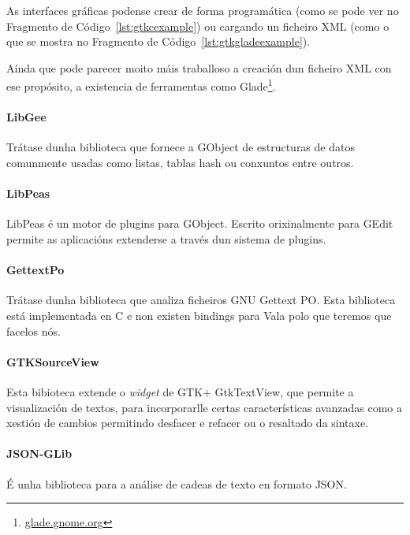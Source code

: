 

As interfaces gráficas podense crear de forma programática (como se pode ver no Fragmento de Código~\ref{lst:gtkcexample}) ou cargando un ficheiro XML (como o que se mostra no Fragmento de Código~\ref{lst:gtkgladeexample}).



Aínda que pode parecer moito máis traballoso a creación dun ficheiro XML con ese propósito, a existencia de ferramentas como Glade\footnote{\href{http://glade.gnome.org}{glade.gnome.org}}.

\paragraph{LibGee} Trátase dunha biblioteca que fornece a GObject de estructuras de datos comunmente usadas como listas, tablas hash ou conxuntos entre outros.

\paragraph{LibPeas} LibPeas é un motor de plugins para GObject. Escrito orixinalmente para GEdit permite as aplicacións extenderse a través dun sistema de plugins.

\paragraph{GettextPo} Trátase dunha biblioteca que analiza ficheiros GNU Gettext PO. Esta biblioteca está implementada en C e non existen bindings para Vala polo que teremos que facelos nós.

\paragraph{GTKSourceView} Esta bibioteca extende o \emph{widget} de GTK+ GtkTextView, que permite a visualización de textos, para incorporarlle certas características avanzadas como a xestión de cambios permitindo desfacer e refacer ou o resaltado da sintaxe.

\paragraph{JSON-GLib} É unha biblioteca para a análise de cadeas de texto en formato JSON.

